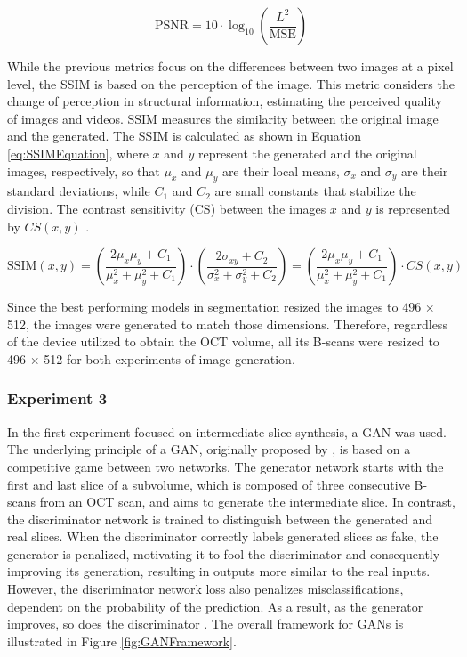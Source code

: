 \begin{equation}
	\text{PSNR} = 10 \cdot \log_{10} \left( \frac{L^2}{\text{MSE}} \right)
	\label{eq:PSNREquation}
\end{equation}

While the previous metrics focus on the differences between two images at a pixel level, the SSIM is based on the perception of the image. This metric considers the change of perception in structural information, estimating the perceived quality of images and videos. SSIM measures the similarity between the original image and the generated. The SSIM is calculated as shown in Equation \ref{eq:SSIMEquation}, where $x$ and $y$ represent the generated and the original images, respectively, so that $\mu_{x}$ and $\mu_{y}$ are their local means, $\sigma_{x}$ and $\sigma_{y}$ are their standard deviations, while $C_{1}$ and $C_{2}$ are small constants that stabilize the division. The contrast sensitivity (CS) between the images $x$ and $y$ is represented by $CS(x,y)$ \parencite{Sara2019}.

\begin{equation}
	\text{SSIM}(x, y) = \left( \frac{2\mu_x \mu_y + C_1}{\mu_x^2 + \mu_y^2 + C_1} \right) \cdot \left( \frac{2\sigma_{xy} + C_2}{\sigma_x^2 + \sigma_y^2 + C_2} \right) = \left( \frac{2\mu_x \mu_y + C_1}{\mu_x^2 + \mu_y^2 + C_1} \right) \cdot CS(x, y)
	\label{eq:SSIMEquation} 
\end{equation}

Since the best performing models in segmentation resized the images to 496 $\times$ 512, the images were generated to match those dimensions. Therefore, regardless of the device utilized to obtain the OCT volume, all its B-scans were resized to 496 $\times$ 512 for both experiments of image generation.

\subsubsection{Experiment 3}
In the first experiment focused on intermediate slice synthesis, a GAN was used. The underlying principle of a GAN, originally proposed by \textcite{Goodfellow2014}, is based on a competitive game between two networks. The generator network starts with the first and last slice of a subvolume, which is composed of three consecutive B-scans from an OCT scan, and aims to generate the intermediate slice. In contrast, the discriminator network is trained to distinguish between the generated and real slices. When the discriminator correctly labels generated slices as fake, the generator is penalized, motivating it to fool the discriminator and consequently improving its generation, resulting in outputs more similar to the real inputs. However, the discriminator network loss also penalizes misclassifications, dependent on the probability of the prediction. As a result, as the generator improves, so does the discriminator \parencite{Goodfellow2020}. The overall framework for GANs is illustrated in Figure \ref{fig:GANFramework}.

